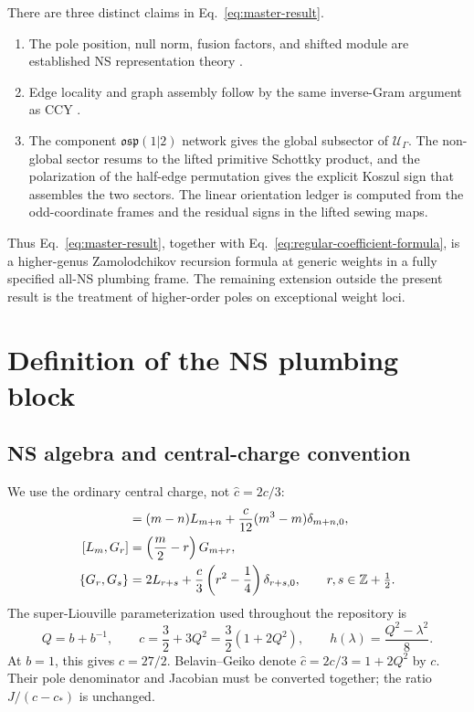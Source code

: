 \documentclass[11pt]{article}
\newcommand{\osp}{\mathfrak{osp}(1|2)}
\newcommand{\U}{\mathcal U}
\newcommand{\half}{\tfrac12}
\begin{document}
There are three distinct claims in Eq.~\eqref{eq:master-result}.
\begin{enumerate}
 \item The pole position, null norm, fusion factors, and shifted module are
 established NS representation theory
 \cite{HadaszJaskolskiSuchanek2007NSBlocks,BelavinGeiko2018CRecursion}.
 \item Edge locality and graph assembly follow by the same inverse-Gram
 argument as CCY \cite{ChoCollierYin2017Recursive}.
 \item The component \(\osp\) network gives the global subsector of
 \(\U_\Gamma\).  The non-global sector resums to the lifted primitive
 Schottky product, and the polarization of the half-edge permutation gives
 the explicit Koszul sign that assembles the two sectors.  The linear
 orientation ledger is computed from the odd-coordinate frames and the
 residual signs in the lifted sewing maps.
\end{enumerate}
Thus Eq.~\eqref{eq:master-result}, together with
Eq.~\eqref{eq:regular-coefficient-formula}, is a higher-genus
Zamolodchikov recursion formula at generic weights in a fully specified
all-NS plumbing frame.  The remaining extension outside the present result
is the treatment of higher-order poles on exceptional weight loci.

\section{Definition of the NS plumbing block}
\label{sec:conventions}

\subsection{NS algebra and central-charge convention}

We use the ordinary central charge, not
\(\widehat c=2c/3\):
\begin{align}
 [L_m,L_n]
 &=(m-n)L_{m+n}
   +\frac{c}{12}(m^3-m)\delta_{m+n,0},
 \notag\\
 [L_m,G_r]
 &=\left(\frac m2-r\right)G_{m+r},
 \notag\\
 \{G_r,G_s\}
 &=2L_{r+s}
   +\frac c3\left(r^2-\frac14\right)\delta_{r+s,0},
 \qquad r,s\in\mathbb Z+\half.
 \label{eq:ns-algebra}
\end{align}
The super-Liouville parameterization used throughout the repository is
\begin{equation}
 Q=b+b^{-1},
 \qquad
 c=\frac32+3Q^2=\frac32(1+2Q^2),
 \qquad
 h(\lambda)=\frac{Q^2-\lambda^2}{8}.
 \label{eq:parameterization}
\end{equation}
At \(b=1\), this gives \(c=27/2\).  Belavin--Geiko denote
\(\widehat c=2c/3=1+2Q^2\) by \(c\).  Their pole denominator and Jacobian
must be converted together; the ratio \(J/(c-c_*)\) is unchanged.
\end{document}
